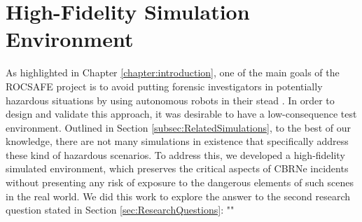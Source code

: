 \chapter{High-Fidelity Simulation Environment}\label{chap:HighFidelitySim}


As highlighted in Chapter \ref{chapter:introduction}, one of the main goals of the ROCSAFE project is to avoid putting forensic investigators in potentially hazardous situations by using autonomous robots in their stead \cite{Bagherzadeh2017ROCSAFE:Incidents}. In order to design and validate this approach, it was desirable to have a low-consequence test environment. Outlined in Section \ref{subsec:RelatedSimulations}, to the best of our knowledge, there are not many simulations in existence that specifically address these kind of hazardous scenarios. To address this, we developed a high-fidelity simulated environment, which preserves the critical aspects of CBRNe incidents without presenting any risk of exposure to the dangerous elements of such scenes in the real world. We did this work to explore the answer to the second research question stated in Section \ref{sec:ResearchQuestions}:
\newline
"\textit{}"\par

